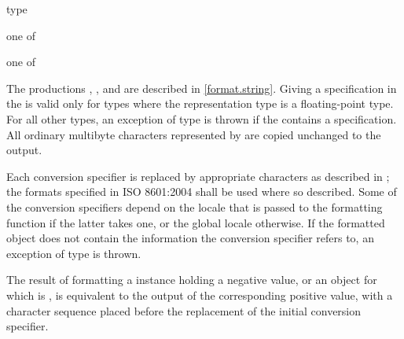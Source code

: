 \begin{ncbnf}
\br
    \terminal{\%}  type
\end{ncbnf}

\begin{ncbnf}
 \textnormal{one of}\br
\end{ncbnf}

\begin{ncbnf}
 \textnormal{one of}\br
    \br
\end{ncbnf}

The productions
,
, and
are described in \ref{format.string}.
Giving a  specification
in the 
is valid only for  types
where the representation type 
is a floating-point type.
For all other  types,
an exception of type  is thrown
if the 
contains a  specification.
All ordinary multibyte characters
represented by 
are copied unchanged to the output.

\pnum
Each conversion specifier 
is replaced by appropriate characters
as described in ;
the formats specified in ISO 8601:2004 shall be used where so described.
Some of the conversion specifiers
depend on the locale that is passed to the formatting function
if the latter takes one,
or the global locale otherwise.
If the formatted object does not contain the information
the conversion specifier refers to,
an exception of type  is thrown.

\pnum
The result of formatting
a  instance holding a negative value, or
an  object  for which  is ,
is equivalent to the output of the corresponding positive value,
with a  character sequence
placed before the replacement of the initial conversion specifier.
\begin{example}
\end{example}

